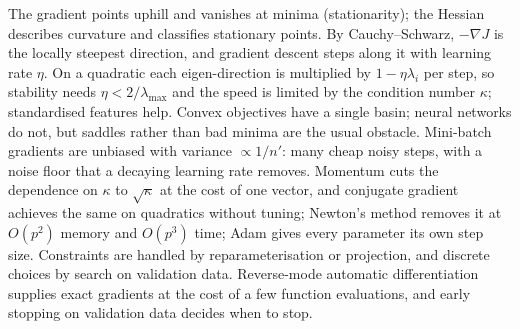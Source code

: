 \documentclass[11pt]{article}
\begin{document}
\begin{keyidea}[Summary]
The gradient points uphill and vanishes at minima (stationarity); the Hessian describes curvature and classifies
stationary points. By Cauchy--Schwarz, $-\nabla J$ is the locally steepest direction, and gradient descent steps
along it with learning rate $\eta$. On a quadratic each eigen-direction is multiplied by $1 - \eta\lambda_i$ per step,
so stability needs $\eta < 2/\lambda_{\max}$ and the speed is limited by the condition number $\kappa$; standardised
features help. Convex objectives have a single basin; neural networks do not, but saddles rather than bad minima are the
usual obstacle. Mini-batch gradients are unbiased with variance $\propto 1/n'$: many cheap noisy steps, with a noise
floor that a decaying learning rate removes. Momentum cuts the dependence on $\kappa$ to $\sqrt\kappa$ at the cost of
one vector, and conjugate gradient achieves the same on quadratics without tuning; Newton's method removes it at
$O(p^2)$ memory and $O(p^3)$ time; Adam gives every parameter its own step size. Constraints are handled by
reparameterisation or projection, and discrete choices by search on validation data. Reverse-mode automatic differentiation supplies exact gradients at the cost of a few function evaluations, and
early stopping on validation data decides when to stop.
\end{keyidea}
\end{document}

